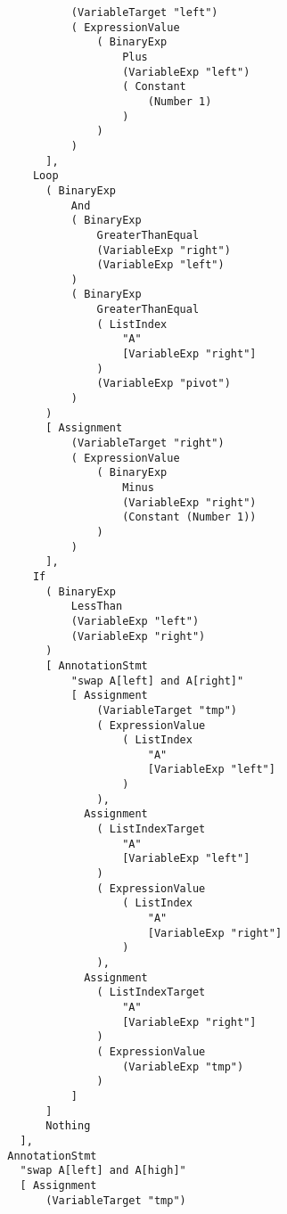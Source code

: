 \begin{lstlisting}
                  (VariableTarget "left")
                  ( ExpressionValue
                      ( BinaryExp
                          Plus
                          (VariableExp "left")
                          ( Constant
                              (Number 1)
                          )
                      )
                  )
              ],
            Loop
              ( BinaryExp
                  And
                  ( BinaryExp
                      GreaterThanEqual
                      (VariableExp "right")
                      (VariableExp "left")
                  )
                  ( BinaryExp
                      GreaterThanEqual
                      ( ListIndex
                          "A"
                          [VariableExp "right"]
                      )
                      (VariableExp "pivot")
                  )
              )
              [ Assignment
                  (VariableTarget "right")
                  ( ExpressionValue
                      ( BinaryExp
                          Minus
                          (VariableExp "right")
                          (Constant (Number 1))
                      )
                  )
              ],
            If
              ( BinaryExp
                  LessThan
                  (VariableExp "left")
                  (VariableExp "right")
              )
              [ AnnotationStmt
                  "swap A[left] and A[right]"
                  [ Assignment
                      (VariableTarget "tmp")
                      ( ExpressionValue
                          ( ListIndex
                              "A"
                              [VariableExp "left"]
                          )
                      ),
                    Assignment
                      ( ListIndexTarget
                          "A"
                          [VariableExp "left"]
                      )
                      ( ExpressionValue
                          ( ListIndex
                              "A"
                              [VariableExp "right"]
                          )
                      ),
                    Assignment
                      ( ListIndexTarget
                          "A"
                          [VariableExp "right"]
                      )
                      ( ExpressionValue
                          (VariableExp "tmp")
                      )
                  ]
              ]
              Nothing
          ],
        AnnotationStmt
          "swap A[left] and A[high]"
          [ Assignment
              (VariableTarget "tmp")

\end{lstlisting}
